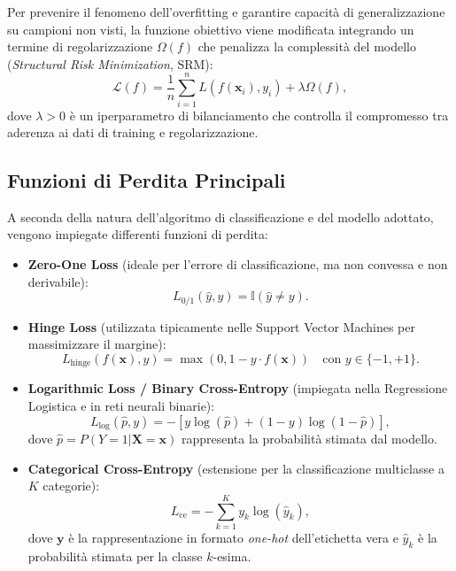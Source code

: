 Per prevenire il fenomeno dell'overfitting e garantire capacità di generalizzazione su campioni non visti, la funzione obiettivo viene modificata integrando un termine di regolarizzazione $\Omega(f)$ che penalizza la complessità del modello (\textit{Structural Risk Minimization}, SRM):
\begin{equation}
\mathcal{L}(f) = \frac{1}{n} \sum_{i=1}^{n} L(f(\mathbf{x}_i), y_i) + \lambda \Omega(f),
\end{equation}
dove $\lambda > 0$ è un iperparametro di bilanciamento che controlla il compromesso tra aderenza ai dati di training e regolarizzazione.

\subsection{Funzioni di Perdita Principali}
A seconda della natura dell'algoritmo di classificazione e del modello adottato, vengono impiegate differenti funzioni di perdita:
\begin{itemize}
    \item \textbf{Zero-One Loss} (ideale per l'errore di classificazione, ma non convessa e non derivabile):
    \begin{equation}
    L_{0/1}(\hat{y}, y) = \mathbb{I}(\hat{y} \neq y).
    \end{equation}
    \item \textbf{Hinge Loss} (utilizzata tipicamente nelle Support Vector Machines per massimizzare il margine):
    \begin{equation}
    L_{\text{hinge}}(f(\mathbf{x}), y) = \max(0, 1 - y \cdot f(\mathbf{x})) \quad \text{con } y \in \{-1, +1\}.
    \end{equation}
    \item \textbf{Logarithmic Loss / Binary Cross-Entropy} (impiegata nella Regressione Logistica e in reti neurali binarie):
    \begin{equation}
    L_{\text{log}}(\hat{p}, y) = - \left[ y \log(\hat{p}) + (1 - y) \log(1 - \hat{p}) \right],
    \end{equation}
    dove $\hat{p} = P(Y=1 | \mathbf{X}=\mathbf{x})$ rappresenta la probabilità stimata dal modello.
    \item \textbf{Categorical Cross-Entropy} (estensione per la classificazione multiclasse a $K$ categorie):
    \begin{equation}
    L_{\text{ce}} = -\sum_{k=1}^{K} y_k \log(\hat{y}_k),
    \end{equation}
    dove $\mathbf{y}$ è la rappresentazione in formato \textit{one-hot} dell'etichetta vera e $\hat{y}_k$ è la probabilità stimata per la classe $k$-esima.
\end{itemize}

